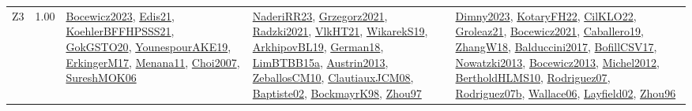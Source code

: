 {\begin{longtable}{p{3cm}r>{\raggedright\arraybackslash}p{6cm}>{\raggedright\arraybackslash}p{6cm}>{\raggedright\arraybackslash}p{8cm}}
\index{Z3}\index{CPSystems!Z3}Z3 &  1.00 & \hyperref[detail:Bocewicz2023]{Bocewicz2023}, \hyperref[detail:Edis21]{Edis21}, \hyperref[detail:KoehlerBFFHPSSS21]{KoehlerBFFHPSSS21}, \hyperref[detail:GokGSTO20]{GokGSTO20}, \hyperref[detail:YounespourAKE19]{YounespourAKE19}, \hyperref[detail:ErkingerM17]{ErkingerM17}, \hyperref[detail:Menana11]{Menana11}, \hyperref[detail:Choi2007]{Choi2007}, \hyperref[detail:SureshMOK06]{SureshMOK06} & \hyperref[detail:NaderiRR23]{NaderiRR23}, \hyperref[detail:Grzegorz2021]{Grzegorz2021}, \hyperref[detail:Radzki2021]{Radzki2021}, \hyperref[detail:VlkHT21]{VlkHT21}, \hyperref[detail:WikarekS19]{WikarekS19}, \hyperref[detail:ArkhipovBL19]{ArkhipovBL19}, \hyperref[detail:German18]{German18}, \hyperref[detail:LimBTBB15a]{LimBTBB15a}, \hyperref[detail:Austrin2013]{Austrin2013}, \hyperref[detail:ZeballosCM10]{ZeballosCM10}, \hyperref[detail:ClautiauxJCM08]{ClautiauxJCM08}, \hyperref[detail:Baptiste02]{Baptiste02}, \hyperref[detail:BockmayrK98]{BockmayrK98}, \hyperref[detail:Zhou97]{Zhou97} & \hyperref[detail:Dimny2023]{Dimny2023}, \hyperref[detail:KotaryFH22]{KotaryFH22}, \hyperref[detail:CilKLO22]{CilKLO22}, \hyperref[detail:Groleaz21]{Groleaz21}, \hyperref[detail:Bocewicz2021]{Bocewicz2021}, \hyperref[detail:Caballero19]{Caballero19}, \hyperref[detail:ZhangW18]{ZhangW18}, \hyperref[detail:Balduccini2017]{Balduccini2017}, \hyperref[detail:BofillCSV17]{BofillCSV17}, \hyperref[detail:Nowatzki2013]{Nowatzki2013}, \hyperref[detail:Bocewicz2013]{Bocewicz2013}, \hyperref[detail:Michel2012]{Michel2012}, \hyperref[detail:BertholdHLMS10]{BertholdHLMS10}, \hyperref[detail:Rodriguez07]{Rodriguez07}, \hyperref[detail:Rodriguez07b]{Rodriguez07b}, \hyperref[detail:Wallace06]{Wallace06}, \hyperref[detail:Layfield02]{Layfield02}, \hyperref[detail:Zhou96]{Zhou96}\\
\end{longtable}
}

\clearpage

